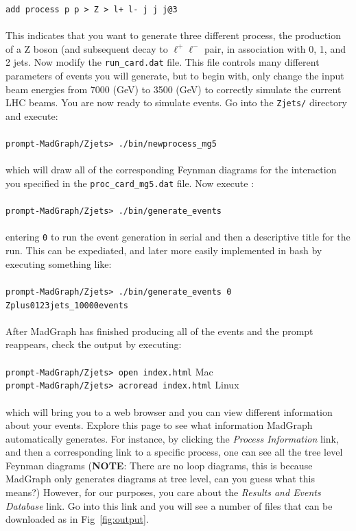 \documentclass[12pt]{article}
\begin{document}
\texttt{add process p p > Z > l+  l- j j j@3}\\ 
\\
This indicates that you want to generate three different process, the production of a Z boson (and subsequent decay to $\ell^{+} \ell^{-}$ pair, in association with 0, 1, and 2 jets.  Now modify the \texttt{run\_card.dat} file.  This file controls many different parameters of events you will generate, but to begin with, only change the input beam energies from 7000 (GeV) to 3500 (GeV) to correctly simulate the current LHC beams.
You are now ready to simulate events.  Go into the \texttt{Zjets/} directory and execute: \\
\\
\texttt{prompt-MadGraph/Zjets> ./bin/newprocess\_mg5}\\ 
\\
which will draw all of the corresponding Feynman diagrams for the interaction you specified in the \texttt{proc\_card\_mg5.dat} file.  Now execute :\\ 
\\
\texttt{prompt-MadGraph/Zjets> ./bin/generate\_events}\\ 
\\
entering \texttt{0} to run the event generation in serial and then a descriptive title for the run.  This can be expediated, and later more easily implemented in bash by executing something like:\\ 
\\
\texttt{prompt-MadGraph/Zjets> ./bin/generate\_events 0 Zplus0123jets\_10000events}\\
\\
After MadGraph has finished producing all of the events and the prompt reappears, check the output by executing:\\ 
\\
\texttt{prompt-MadGraph/Zjets> open index.html} \hspace{2cm}Mac  \\ 
\texttt{prompt-MadGraph/Zjets> acroread index.html} \hspace{1cm} Linux\\ 
\\
which will bring you to a web browser and you can view different information about your events.  Explore this page to see what information MadGraph automatically generates.  For instance, by clicking the \textit{Process Information} link, and then a corresponding link to a specific process, one can see all the tree level Feynman diagrams (\textbf{NOTE}: There are no loop diagrams, this is because MadGraph only generates diagrams at tree level, can you guess what this means?)  However, for our purposes, you care about the \textit{Results and Events Database} link.  Go into this link and you will see a number of files that can be downloaded as in Fig~\ref{fig:output}.
\end{document}
